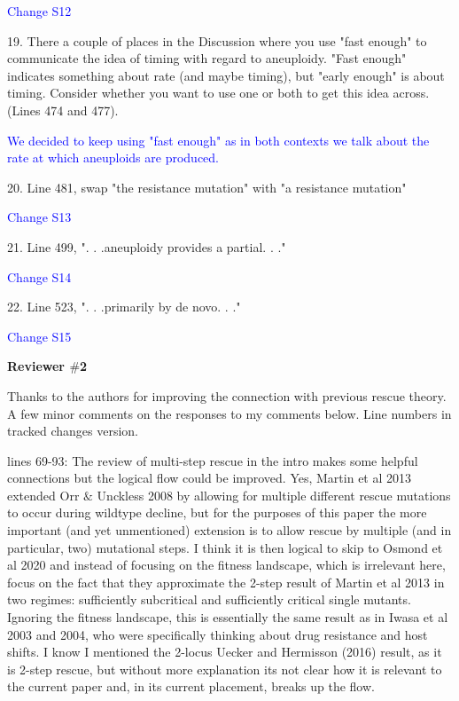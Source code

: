 \documentclass[12pt]{extarticle}
\begin{document}
\textcolor{blue}{Change S12}

19. There a couple of places in the Discussion where you use "fast enough" to communicate the idea of timing with regard to aneuploidy. "Fast enough" indicates something about rate (and maybe timing), but "early enough" is about timing. Consider whether you want to use one or both to get this idea across. (Lines 474 and 477).

\textcolor{blue}{We decided to keep using "fast enough" as in both contexts we talk about the rate at which aneuploids are produced.}

20. Line 481, swap "the resistance mutation" with "a resistance mutation"

\textcolor{blue}{Change S13}

21. Line 499, ". . .aneuploidy provides a partial. . ."

\textcolor{blue}{Change S14}

22. Line 523, ". . .primarily by de novo. . ."

\textcolor{blue}{Change S15}

\textbf{Reviewer $\#$2}

Thanks to the authors for improving the connection with previous rescue theory. A few minor comments on the responses to my comments below. Line numbers in tracked changes version.

lines 69-93: The review of multi-step rescue in the intro makes some helpful connections but the logical flow could be improved. Yes, Martin et al 2013 extended Orr $\&$ Unckless 2008 by allowing for multiple different rescue mutations to occur during wildtype decline, but for the purposes of this paper the more important (and yet unmentioned) extension is to allow rescue by multiple (and in particular, two) mutational steps. I think it is then logical to skip to Osmond et al 2020 and instead of focusing on the fitness landscape, which is irrelevant here, focus on the fact that they approximate the 2-step result of Martin et al 2013 in two regimes: sufficiently subcritical and sufficiently critical single mutants. Ignoring the fitness landscape, this is essentially the same result as in Iwasa et al 2003 and 2004, who were specifically thinking about drug resistance and host shifts. I know I mentioned the 2-locus Uecker and Hermisson (2016) result, as it is 2-step rescue, but without more explanation its not clear how it is relevant to the current paper and, in its current placement, breaks up the flow.
\end{document}
